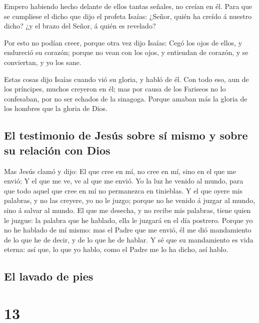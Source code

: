  Empero habiendo hecho delante de ellos tantas señales,
no creían en él.  Para que se cumpliese el dicho que dijo
el profeta Isaías: ¿Señor, quién ha creído á nuestro dicho? ¿y el brazo
del Señor, á quién es revelado?

 Por esto no podían creer, porque otra vez dijo Isaías:
 Cegó los ojos de ellos, y endureció su corazón; porque
no vean con los ojos, y entiendan de corazón, y se conviertan, y yo los
sane.

 Estas cosas dijo Isaías cuando vió su gloria, y habló de
él.  Con todo eso, aun de los príncipes, muchos creyeron
en él; mas por causa de los Fariseos no lo confesaban, por no ser
echados de la sinagoga.  Porque amaban más la gloria de
los hombres que la gloria de Dios.

\hypertarget{el-testimonio-de-jesuxfas-sobre-suxed-mismo-y-sobre-su-relaciuxf3n-con-dios}{%
\subsection{El testimonio de Jesús sobre sí mismo y sobre su relación
con
Dios}\label{el-testimonio-de-jesuxfas-sobre-suxed-mismo-y-sobre-su-relaciuxf3n-con-dios}}

 Mas Jesús clamó y dijo: El que cree en mí, no cree en
mí, sino en el que me envió;  Y el que me ve, ve al que
me envió.  Yo la luz he venido al mundo, para que todo
aquel que cree en mí no permanezca en tinieblas.  Y el
que oyere mis palabras, y no las creyere, yo no le juzgo; porque no he
venido á juzgar al mundo, sino á salvar al mundo.  El que
me desecha, y no recibe mis palabras, tiene quien le juzgue: la palabra
que he hablado, ella le juzgará en el día postrero. 
Porque yo no he hablado de mí mismo: mas el Padre que me envió, él me
dió mandamiento de lo que he de decir, y de lo que he de hablar.
 Y sé que su mandamiento es vida eterna: así que, lo que
yo hablo, como el Padre me lo ha dicho, así hablo.

\hypertarget{el-lavado-de-pies}{%
\subsection{El lavado de pies}\label{el-lavado-de-pies}}

\hypertarget{section-12}{%
\section{13}\label{section-12}}

